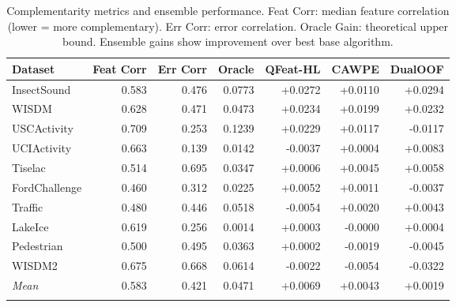 \begin{table}[!htb]
\caption{Complementarity metrics and ensemble performance. Feat Corr: median feature correlation (lower = more complementary). Err Corr: error correlation. Oracle Gain: theoretical upper bound. Ensemble gains show improvement over best base algorithm.}\label{tab:complementarity_summary}
\centering
\small
\begin{tabular}{lrrrrrr}
\toprule
Dataset & Feat Corr & Err Corr & Oracle & QFeat-HL & CAWPE & DualOOF \\
\midrule
InsectSound          & 0.583 & 0.476 & 0.0773 & +0.0272 & +0.0110 & +0.0294 \\
WISDM                & 0.628 & 0.471 & 0.0473 & +0.0234 & +0.0199 & +0.0232 \\
USCActivity          & 0.709 & 0.253 & 0.1239 & +0.0229 & +0.0117 & -0.0117 \\
UCIActivity          & 0.663 & 0.139 & 0.0142 & -0.0037 & +0.0004 & +0.0083 \\
Tiselac              & 0.514 & 0.695 & 0.0347 & +0.0006 & +0.0045 & +0.0058 \\
FordChallenge        & 0.460 & 0.312 & 0.0225 & +0.0052 & +0.0011 & -0.0037 \\
Traffic              & 0.480 & 0.446 & 0.0518 & -0.0054 & +0.0020 & +0.0043 \\
LakeIce              & 0.619 & 0.256 & 0.0014 & +0.0003 & -0.0000 & +0.0004 \\
Pedestrian           & 0.500 & 0.495 & 0.0363 & +0.0002 & -0.0019 & -0.0045 \\
WISDM2               & 0.675 & 0.668 & 0.0614 & -0.0022 & -0.0054 & -0.0322 \\
\midrule
\textit{Mean} & 0.583 & 0.421 & 0.0471 & +0.0069 & +0.0043 & +0.0019 \\
\botrule
\end{tabular}
\end{table}